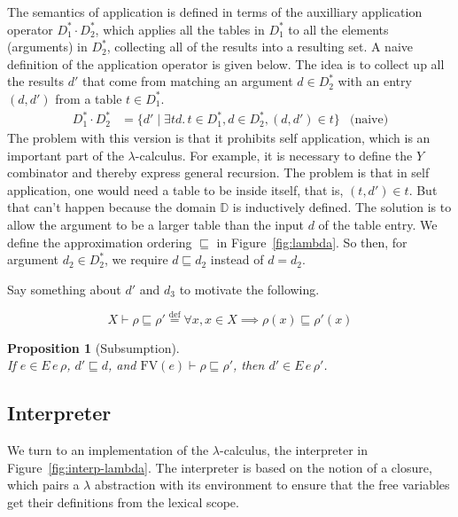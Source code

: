 \documentclass{tufte-handout}
\newcommand{\defeq}[0]{\overset{\mathrm{def}}{=}}
\newtheorem{proposition}[theorem]{Proposition}
\begin{document}
The semantics of application is defined in terms of the auxilliary
application operator $D^{*}_1 \cdot D^{*}_2$, which applies all the
tables in $D^{*}_1$ to all the elements (arguments) in $D^{*}_2$,
collecting all of the results into a resulting set.  A naive
definition of the application operator is given below. The idea is to
collect up all the results $d'$ that come from matching an argument $d
\in D^{*}_2$ with an entry $(d,d')$ from a table $t \in D^{*}_1$.
\begin{align*}
  D^{*}_1 \cdot D^{*}_2 &= 
  \{ d' \mid
  \exists t d.\, t \in D^{*}_1, d \in D^{*}_2, 
    (d,d') \in t
  \}
  & \text{(naive)}
\end{align*}
The problem with this version is that it prohibits self application,
which is an important part of the $\lambda$-calculus.  For example, it
is necessary to define the $Y$ combinator and thereby express general
recursion. The problem is that in self application, one would need a
table to be inside itself, that is, $(t,d') \in t$.  But that can't
happen because the domain $\mathbb{D}$ is inductively defined. The
solution is to allow the argument to be a larger table than the input
$d$ of the table entry. We define the approximation ordering
$\sqsubseteq$ in Figure~\ref{fig:lambda}.  So then, for argument $d_2
\in D^{*}_2$, we require $d \sqsubseteq d_2$ instead of $d = d_2$.

Say something about $d'$ and $d_3$ to motivate the following.

\[
X \vdash \rho \sqsubseteq \rho' \defeq
  \forall x, x \in X \implies \rho(x) \sqsubseteq \rho'(x)
\]

\begin{proposition}[Subsumption]\ \\
  \label{prop:sub}
  If $e \in E\,e\,\rho$, $d' \sqsubseteq d$,
  and $\mathrm{FV}(e) \vdash \rho \sqsubseteq \rho'$,
  then $d' \in E\,e\,\rho'$.
\end{proposition}

\subsection{Interpreter}

We turn to an implementation of the $\lambda$-calculus, the
interpreter in Figure~\ref{fig:interp-lambda}. The interpreter is
based on the notion of a closure, which pairs a $\lambda$ abstraction
with its environment to ensure that the free variables get their
definitions from the lexical scope.
\end{document}
